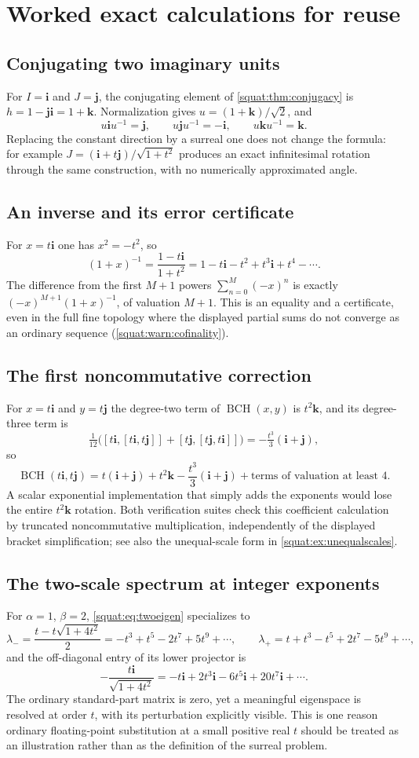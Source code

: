 \documentclass[11pt,letterpaper]{article}
\numberwithin{equation}{section}
\theoremstyle{definition}
\theoremstyle{remark}
\newcommand{\ii}{\mathbf i}
\newcommand{\jj}{\mathbf j}
\newcommand{\kk}{\mathbf k}
\newcommand{\BCH}{\operatorname{BCH}}
\begin{document}
\section{Worked exact calculations for reuse}\label{squat:app:calculations}

\subsection{Conjugating two imaginary units}
For $I=\ii$ and $J=\jj$, the conjugating element of \cref{squat:thm:conjugacy} is
$h=1-\jj\ii=1+\kk$. Normalization gives $u=(1+\kk)/\sqrt2$, and
\[
 u\ii u^{-1}=\jj,\qquad u\jj u^{-1}=-\ii,\qquad u\kk u^{-1}=\kk .
\]
Replacing the constant direction by a surreal one does not change the formula: for example
$J=(\ii+t\jj)/\sqrt{1+t^2}$ produces an exact infinitesimal rotation through the same
construction, with no numerically approximated angle.

\subsection{An inverse and its error certificate}
For $x=t\ii$ one has $x^2=-t^2$, so
\[
 (1+x)^{-1}=\frac{1-t\ii}{1+t^2}=1-t\ii-t^2+t^3\ii+t^4-\cdots .
\]
The difference from the first $M+1$ powers $\sum_{n=0}^M(-x)^n$ is exactly
$(-x)^{M+1}(1+x)^{-1}$, of valuation $M+1$. This is an equality and a certificate, even in
the full fine topology where the displayed partial sums do not converge as an ordinary
sequence (\cref{squat:warn:cofinality}).

\subsection{The first noncommutative correction}
For $x=t\ii$ and $y=t\jj$ the degree-two term of $\BCH(x,y)$ is $t^2\kk$, and its
degree-three term is
\[
 \tfrac1{12}\bigl([t\ii,[t\ii,t\jj]]+[t\jj,[t\jj,t\ii]]\bigr)=-\tfrac{t^3}{3}(\ii+\jj),
\]
so
\[
 \BCH(t\ii,t\jj)=t(\ii+\jj)+t^2\kk-\frac{t^3}{3}(\ii+\jj)
 +\text{terms of valuation at least }4 .
\]
A scalar exponential implementation that simply adds the exponents would lose the entire
$t^2\kk$ rotation. Both verification suites check this coefficient calculation by truncated
noncommutative multiplication, independently of the displayed bracket simplification; see
also the unequal-scale form in \cref{squat:ex:unequalscales}.

\subsection{The two-scale spectrum at integer exponents}
For $\alpha=1$, $\beta=2$, \cref{squat:eq:twoeigen} specializes to
\[
 \lambda_-=\frac{t-t\sqrt{1+4t^2}}2=-t^3+t^5-2t^7+5t^9+\cdots,
 \qquad
 \lambda_+=t+t^3-t^5+2t^7-5t^9+\cdots,
\]
and the off-diagonal entry of its lower projector is
\[
 -\frac{t\ii}{\sqrt{1+4t^2}}=-t\ii+2t^3\ii-6t^5\ii+20t^7\ii+\cdots .
\]
The ordinary standard-part matrix is zero, yet a meaningful eigenspace is resolved at order
$t$, with its perturbation explicitly visible. This is one reason ordinary floating-point
substitution at a small positive real $t$ should be treated as an illustration rather than
as the definition of the surreal problem.
\end{document}
